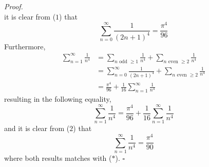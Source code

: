 \documentclass[12pt]{article}
\newenvironment{proof}{\textit{Proof.}}{\hfill$\square$}
\begin{document}
\begin{proof}
\begin{equation}
    \end{equation}
    it is clear from ($1$) that
    \begin{equation*}
        \sum_{n=0}^{\infty}\frac{1}{(2n+1)^4} = \frac{\pi^4}{96}
    \end{equation*}
    Furthermore,
    \begin{align*}
        \sum_{n=1}^{\infty}\frac{1}{n^4} &= \sum_{n\text{ odd }\ge1}\frac{1}{n^4} + \sum_{n\text{ even }\ge2}\frac{1}{n^4} \\
        &= \sum_{n=0}^{\infty}\frac{1}{(2n+1)^4} + \sum_{n\text{ even }\ge2}\frac{1}{n^4} \\
        &= \frac{\pi^4}{96} + \frac{1}{16}\sum_{n=1}^{\infty}\frac{1}{n^4}
    \end{align*}
    resulting in the following equality,
    \begin{equation}
        \sum_{n=1}^{\infty}\frac{1}{n^4} = \frac{\pi^4}{96} + \frac{1}{16}\sum_{n=1}^{\infty}\frac{1}{n^4}
    \end{equation}
    and it is clear from ($2$) that 
    \begin{equation*}
        \sum_{n=1}^{\infty}\frac{1}{n^4} = \frac{\pi^4}{90}
    \end{equation*}
    where both results matches with ($*$).
\end{proof}
\newpage
\end{document}
